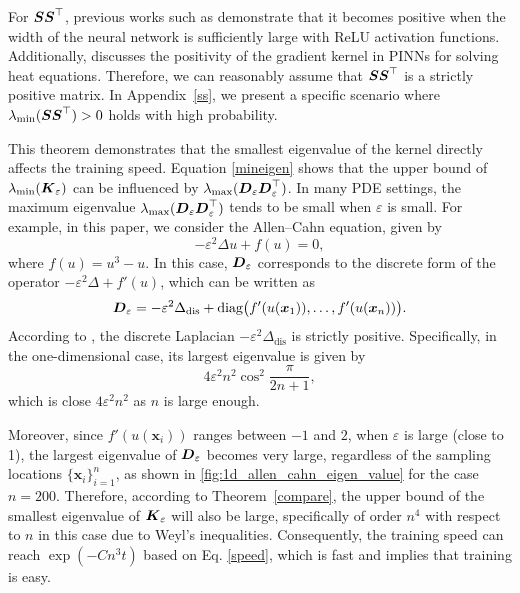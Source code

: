 \begin{remark}\label{hard}
    For \( \boldsymbol{S}\boldsymbol{S}^{\top} \), previous works such as \cite{luo2020two, allen2019convergence, arora2019exact, cao2020generalization, yang2025homotopy} demonstrate that it becomes positive when the width of the neural network is sufficiently large with ReLU activation functions. Additionally, \cite{gao2023gradient} discusses the positivity of the gradient kernel in PINNs for solving heat equations. Therefore, we can reasonably assume that \( \boldsymbol{S}\boldsymbol{S}^{\top} \) is a strictly positive matrix. In Appendix~\ref{ss}, we present a specific scenario where \( \lambda_{\text{min}}(\boldsymbol{S}\boldsymbol{S}^{\top}) > 0 \) holds with high probability.


   This theorem demonstrates that the smallest eigenvalue of the kernel directly affects the training speed. Equation \eqref{mineigen} shows that the upper bound of \( \lambda_{\text{min}}(\boldsymbol{K}_{\varepsilon}) \) can be influenced by \( \lambda_{\text{max}}(\boldsymbol{D}_{\varepsilon}\boldsymbol{D}_{\varepsilon}^\top) \). In many PDE settings, the maximum eigenvalue \( \lambda_{\text{max}}(\boldsymbol{D}_{\varepsilon}\boldsymbol{D}_{\varepsilon}^\top) \) tends to be small when \( \varepsilon \) is small. For example, in this paper, we consider the Allen–Cahn equation, given by
\[
-\varepsilon^2\Delta u + f(u) = 0,
\]
where \( f(u) = u^3 - u \). In this case, \( \boldsymbol{D}_\varepsilon \) corresponds to the discrete form of the operator \( -\varepsilon^2\Delta + f'(u) \), which can be written as
\begin{equation}
   \boldsymbol{D}_\varepsilon= -\varepsilon^2\Delta_{\text{dis}} + \text{diag} \big(f'(u(\boldsymbol{x}_1)), \dots, f'(u(\boldsymbol{x}_n)) \big).
    \label{eq:discete_operator}
\end{equation}
According to \cite{morton2005numerical}, the discrete Laplacian \( -\varepsilon^2\Delta_{\text{dis}} \) is strictly positive. Specifically, in the one-dimensional case, its largest eigenvalue is given by
\[
4\varepsilon^2 n^2 \cos^2 \frac{ \pi}{2n+1},
\]
which is close \( 4\varepsilon^2n^2 \) as \( n  \) is large enough. 

Moreover, since \( f'(u(\boldsymbol{x}_i)) \) ranges between \(-1\) and \(2\), when \( \varepsilon \) is large (close to 1), the largest eigenvalue of  
\( \boldsymbol{D}_\varepsilon \)
becomes very large, regardless of the sampling locations \( \{\boldsymbol{x}_i\}_{i=1}^n \), as shown in \cref{fig:1d_allen_cahn_eigen_value} for the case \( n=200 \). Therefore, according to Theorem~\ref{compare}, the upper bound of the smallest eigenvalue of \( \boldsymbol{K}_\varepsilon \) will also be large, specifically of order \( n^4 \) with respect to \( n \) in this case due to Weyl’s inequalities. Consequently, the training speed can reach \( \exp(-Cn^3t) \) based on Eq. \eqref{speed}, which is fast and implies that training is easy.


\end{remark}
